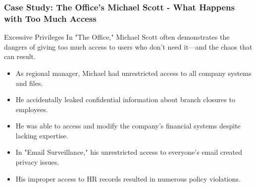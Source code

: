 \documentclass{beamer}
\begin{document}
    \begin{frame}
    \frametitle{Case Study: The Office's Michael Scott - What Happens with Too Much Access}
    
    \begin{exampleblock}{Excessive Privileges}
    In "The Office," Michael Scott often demonstrates the dangers of giving too much access to users who don't need it—and the chaos that can result.
    \end{exampleblock}
    
    \begin{itemize}
    \item As regional manager, Michael had unrestricted access to all company systems and files.
    \item He accidentally leaked confidential information about branch closures to employees.
    \item He was able to access and modify the company's financial systems despite lacking expertise.
    \item In "Email Surveillance," his unrestricted access to everyone's email created privacy issues.
    \item His improper access to HR records resulted in numerous policy violations.
    \end{itemize}
    
    \end{frame}
    
\end{document}
